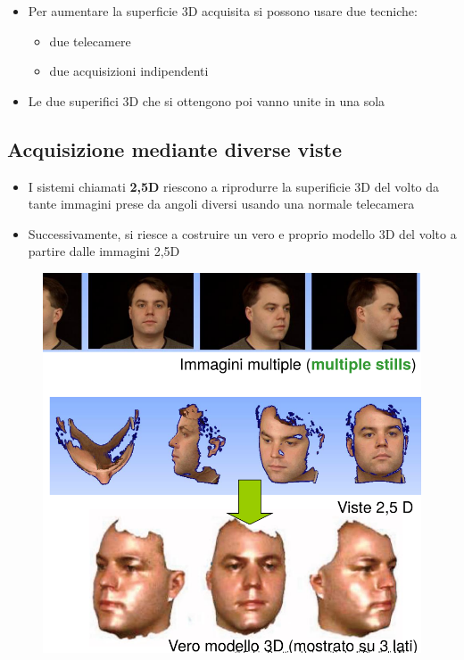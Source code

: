 \documentclass{report}
\begin{document}
\begin{itemize}
    \item Per aumentare la superficie 3D acquisita si possono usare due tecniche:
    \begin{itemize}
        \item due telecamere 
        \item due acquisizioni indipendenti
    \end{itemize}
    \item Le due superifici 3D che si ottengono poi vanno unite in una sola
\end{itemize}

\subsection{Acquisizione mediante diverse viste}
\begin{itemize}
    \item I sistemi chiamati \textbf{2,5D} riescono a riprodurre la 
    superificie 3D del volto da tante immagini prese da angoli diversi 
    usando una normale telecamera 
    \item Successivamente, si riesce a costruire un vero e proprio modello 3D 
    del volto a partire dalle immagini 2,5D
\end{itemize}

\begin{figure}[ht]
    \centering
    \includegraphics[width=0.6\linewidth]{images/2,5d.png}
\end{figure}
\end{document}
